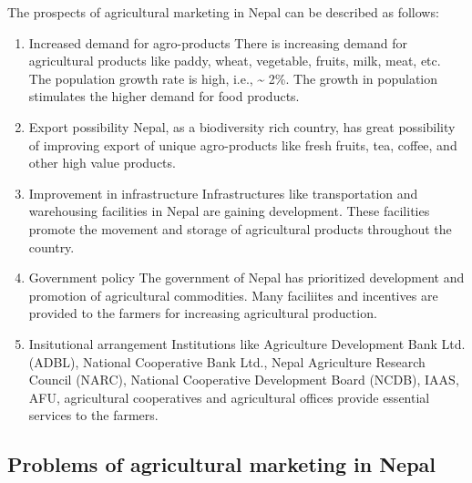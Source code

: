 \documentclass[11pt,]{book}
\theoremstyle{definition}
\theoremstyle{definition}
\theoremstyle{definition}
\theoremstyle{remark}
\begin{document}
The prospects of agricultural marketing in Nepal can be described as
follows:

\begin{enumerate}
\def\labelenumi{\arabic{enumi}.}
\item
  Increased demand for agro-products \newline There is increasing demand
  for agricultural products like paddy, wheat, vegetable, fruits, milk,
  meat, etc. The population growth rate is high, i.e., \textasciitilde{}
  2\%. The growth in population stimulates the higher demand for food
  products.
\item
  Export possibility \newline Nepal, as a biodiversity rich country, has
  great possibility of improving export of unique agro-products like
  fresh fruits, tea, coffee, and other high value products.
\item
  Improvement in infrastructure \newline Infrastructures like
  transportation and warehousing facilities in Nepal are gaining
  development. These facilities promote the movement and storage of
  agricultural products throughout the country.
\item
  Government policy \newline The government of Nepal has prioritized
  development and promotion of agricultural commodities. Many faciliites
  and incentives are provided to the farmers for increasing agricultural
  production.
\item
  Insitutional arrangement \newline Institutions like Agriculture
  Development Bank Ltd. (ADBL), National Cooperative Bank Ltd., Nepal
  Agriculture Research Council (NARC), National Cooperative Development
  Board (NCDB), IAAS, AFU, agricultural cooperatives and agricultural
  offices provide essential services to the farmers.
\end{enumerate}

\subsection{Problems of agricultural marketing in
Nepal}\label{problems-of-agricultural-marketing-in-nepal}
\end{document}
